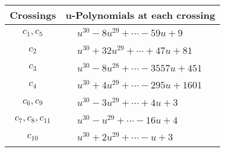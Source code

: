 \documentclass[1p]{elsarticle_modified}
\theoremstyle{definition}
\begin{document}
\begin{tabular}{m{50pt}|m{274pt}}
Crossings & \hspace{64pt}u-Polynomials at each crossing \\
\hline $$\begin{aligned}c_{1},c_{5}\end{aligned}$$&$\begin{aligned}
&u^{30}-8 u^{29}+\cdots-59 u+9
\end{aligned}$\\
\hline $$\begin{aligned}c_{2}\end{aligned}$$&$\begin{aligned}
&u^{30}+32 u^{29}+\cdots+47 u+81
\end{aligned}$\\
\hline $$\begin{aligned}c_{3}\end{aligned}$$&$\begin{aligned}
&u^{30}-8 u^{28}+\cdots-3557 u+451
\end{aligned}$\\
\hline $$\begin{aligned}c_{4}\end{aligned}$$&$\begin{aligned}
&u^{30}+4 u^{29}+\cdots-295 u+1601
\end{aligned}$\\
\hline $$\begin{aligned}c_{6},c_{9}\end{aligned}$$&$\begin{aligned}
&u^{30}-3 u^{29}+\cdots+4 u+3
\end{aligned}$\\
\hline $$\begin{aligned}c_{7},c_{8},c_{11}\end{aligned}$$&$\begin{aligned}
&u^{30}- u^{29}+\cdots-16 u+4
\end{aligned}$\\
\hline $$\begin{aligned}c_{10}\end{aligned}$$&$\begin{aligned}
&u^{30}+2 u^{29}+\cdots- u+3
\end{aligned}$\\
\hline
\end{tabular}\\~\\
\newpage\renewcommand{\arraystretch}{1}
\end{document}
